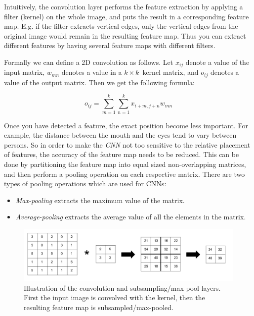 Intuitively, the convolution layer performs the feature extraction by applying a filter (kernel) on the whole image, and puts the result in a corresponding feature map. E.g. if the filter extracts vertical edges, only the vertical edges from the original image would remain in the resulting feature map. Thus you can extract different features by having several feature maps with different filters.  

Formally we can define a 2D convolution as follows. Let $ x_{ij} $ denote a value of the input matrix, $ w_{mn} $ denotes a value in a $ k \times k $ kernel matrix, and $ o_{ij} $ denotes a value of the output matrix. Then we get the following formula:

\begin{equation*}
o_{ij} = \sum_{m=1}^{k}\sum_{n=1}^{k} x_{i+m, j+n}w_{mn}
\end{equation*}


Once you have detected a feature, the exact position become less important. For example, the distance between the mouth and the eyes tend to vary between persons. So in order to make the \textit{CNN} not too sensitive to the relative placement of features, the accuracy of the feature map needs to be reduced. This can be done by partitioning the feature map into equal sized non-overlapping matrices, and then perform a pooling operation on each respective matrix. There are two types of pooling operations which are used for CNNs: 

\begin{itemize}
	\item \textit{Max-pooling} extracts the maximum value of the matrix.
	\item \textit{Average-pooling} extracts the average value of all the elements in the matrix.
\end{itemize}

\begin{figure}[h!]
  \centering
      \includegraphics[width=1.0\textwidth]{Figures/Background/Convolution-Maxpooling}
  \caption{Illustration of the convolution and subsampling/max-pool layers. First the input image is convolved with the kernel, then the resulting feature map is subsampled/max-pooled.}
\end{figure}








